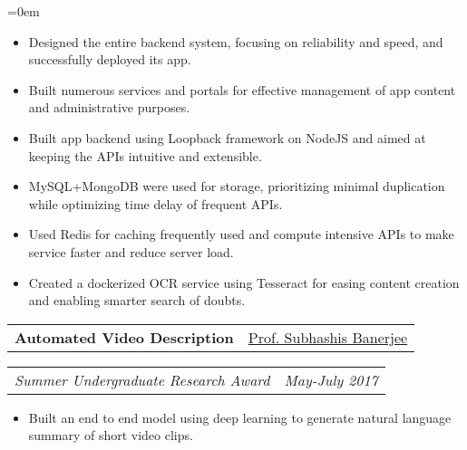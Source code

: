 \documentclass{article}
\makeatletter
\newcommand{\headerrow}[2]
{\begin{tabular*}{\linewidth}{l@{\extracolsep{\fill}}r}
    #1 &
    #2 \\
\end{tabular*}}
\makeatother
\begin{document}
\begin{list} {}{\leftmargin=0em}
    \begin{itemize}
    \setlength\itemsep{0.0em}
    \item Designed the entire backend system, focusing on reliability and speed, and successfully deployed its app.
    \item Built numerous services and portals for effective management of app content and administrative purposes.
    \item Built app backend using Loopback framework on NodeJS and aimed at keeping the APIs intuitive and extensible.
    \item MySQL+MongoDB were used for storage, prioritizing minimal duplication while optimizing time delay of frequent APIs.
    \item Used Redis for caching frequently used and compute intensive APIs to make service faster and reduce server load.
    \item Created a dockerized OCR service using Tesseract for easing content creation and enabling smarter search of doubts.
    \end{itemize}
    \item[]
    \headerrow {\textbf{Automated Video Description}}{\underline{Prof. Subhashis Banerjee}}
    \headerrow {\emph{Summer Undergraduate Research Award}}{\emph{May-July 2017}}
    \begin{itemize}
    \setlength\itemsep{0.0em}
        \item Built an end to end model using deep learning to generate natural language summary of short video clips.

\end{itemize}
\end{list}
\end{document}
